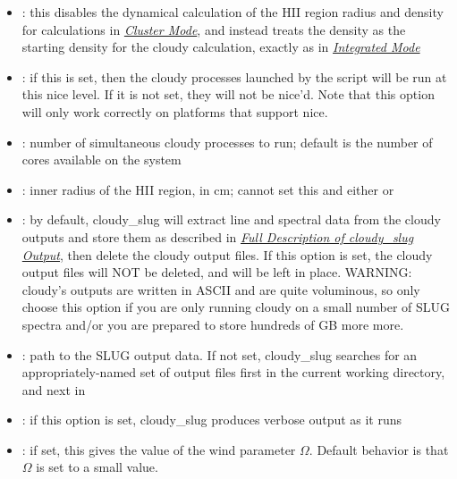 \documentclass[letterpaper,10pt,english]{sphinxmanual}
\begin{document}
\begin{itemize}
\item {} 
: this disables the dynamical calculation of the
HII region radius and density for calculations in
{\hyperref[cloudy:sssec\string-cloudy\string-cluster\string-mode]{\emph{Cluster Mode}}}, and instead treats the density as
the starting density for the cloudy calculation, exactly as in
{\hyperref[cloudy:sssec\string-cloudy\string-integrated\string-mode]{\emph{Integrated Mode}}}

\item {} 
: if this is set, then the
cloudy processes launched by the script will be run at this nice
level. If it is not set, they will not be nice'd. Note that this
option will only work correctly on platforms that support nice.

\item {} 
: number of simultaneous cloudy processes
to run; default is the number of cores available on the system

\item {} 
: inner radius of the HII region, in
cm; cannot set this and either  or 

\item {} 
: by default, cloudy\_slug will extract line and
spectral data from the cloudy outputs and store them as described in
{\hyperref[cloudy:ssec\string-cloudy\string-output]{\emph{Full Description of cloudy\_slug Output}}}, then delete the cloudy output files. If
this option is set, the cloudy output files will NOT be deleted, and
will be left in place. WARNING: cloudy's outputs are written in
ASCII and are quite voluminous, so only choose this option if you
are only running cloudy on a small number of SLUG spectra and/or you
are prepared to store hundreds of GB more more.

\item {} 
: path to the SLUG output data. If not set,
cloudy\_slug searches for an appropriately-named set of output files
first in the current working directory, and next in

\item {} 
: if this option is set, cloudy\_slug produces
verbose output as it runs

\item {} 
: if set, this gives the value of the wind
parameter \(\Omega\). Default behavior is that \(\Omega\) is
set to a small value.

\end{itemize}
\end{document}
